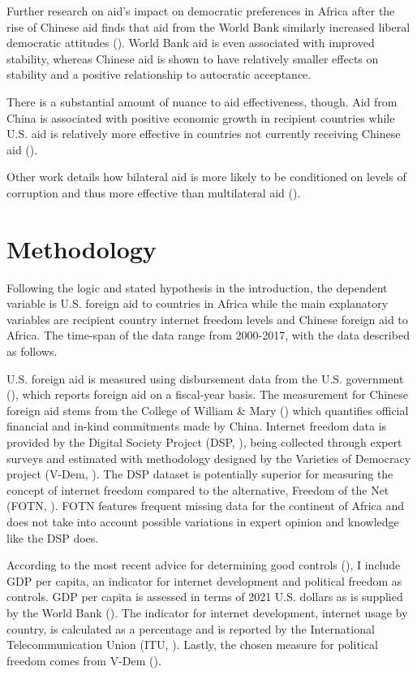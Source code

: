 \documentclass{article}
\begin{document}
Further research on aid's impact on democratic preferences in Africa after the rise of Chinese aid finds that aid from the World Bank similarly increased liberal democratic attitudes (\cite{gehring2022}). World Bank aid is even associated with improved stability, whereas Chinese aid is shown to have relatively smaller effects on stability and a positive relationship to autocratic acceptance.

There is a substantial amount of nuance to aid effectiveness, though. Aid from China is associated with positive economic growth in recipient countries while U.S. aid is relatively more effective in countries not currently receiving Chinese aid (\cite{dreher2021}).

Other work details how bilateral aid is more likely to be conditioned on levels of corruption and thus more effective than multilateral aid (\cite{christensen2011}).

\section*{Methodology}
Following the logic and stated hypothesis in the introduction, the dependent variable is U.S. foreign aid to countries in Africa while the main explanatory variables are recipient country internet freedom levels and Chinese foreign aid to Africa. The time-span of the data range from 2000-2017, with the data described as follows.

U.S. foreign aid is measured using disbursement data from the U.S. government (\cite{government2022e}), which reports foreign aid on a fiscal-year basis. The measurement for Chinese foreign aid stems from the College of William \& Mary (\cite{custer2021}) which quantifies official financial and in-kind commitments made by China. Internet freedom data is provided by the Digital Society Project (DSP, \cite{mechkova2022}), being collected through expert surveys and estimated with methodology designed by the Varieties of Democracy project (V-Dem, \cite{coppedge2022}). The DSP dataset is potentially superior for measuring the concept of internet freedom compared to the alternative, Freedom of the Net (FOTN, \cite{house2022}). FOTN features frequent missing data for the continent of Africa and does not take into account possible variations in expert opinion and knowledge like the DSP does.

According to the most recent advice for determining good controls (\cite{cinelli2022}), I include GDP per capita, an indicator for internet development and political freedom as controls. GDP per capita is assessed in terms of 2021 U.S. dollars as is supplied by the World Bank (\cite{bank2022}). The indicator for internet development, internet usage by country, is calculated as a percentage and is reported by the International Telecommunication Union (ITU, \cite{itu2022}). Lastly, the chosen measure for political freedom comes from V-Dem (\cite{coppedge2022a}).
\end{document}
